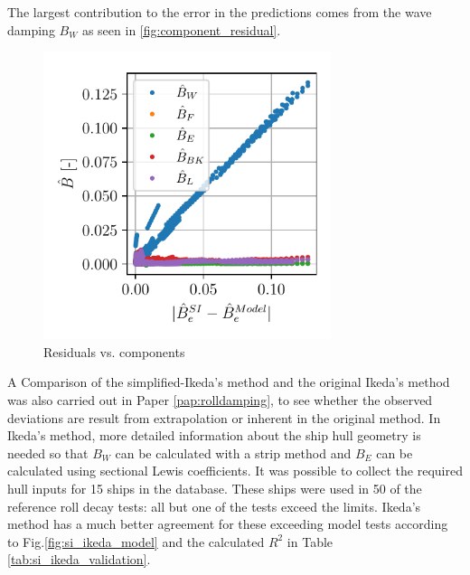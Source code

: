 \noindent The largest contribution to the error in the predictions comes from the wave damping $B_W$ as seen in \autoref{fig:component_residual}.
\begin{figure}[H]
    \includegraphics[width=0.75\textwidth]{kappa/images/component_residual.pdf}
    \caption{Residuals vs. components}
    \label{fig:component_residual}
\end{figure}
\noindent A Comparison of the simplified-Ikeda's method and the original Ikeda's method was also carried out in Paper \ref{pap:rolldamping}, to see whether the observed deviations are result from extrapolation or inherent in the original method. In Ikeda's method, more detailed information about the ship hull geometry is needed so that $B_W$ can be calculated with a strip method and $B_E$ can be calculated using sectional Lewis coefficients. It was possible to collect the required hull inputs for 15 ships in the database. These ships were used in 50 of the reference roll decay tests: all but one of the tests exceed the limits. Ikeda's method has a much better agreement for these exceeding model tests according to Fig.\ref{fig:si_ikeda_model} and the calculated $R^2$ in Table \ref{tab:si_ikeda_validation}.

